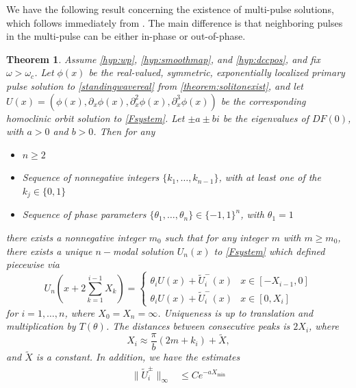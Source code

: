 \documentclass[12pt]{article}
\newtheorem{theorem}{Theorem}
\begin{document}
We have the following result concerning the existence of multi-pulse solutions, which follows immediately from \cite[Theorem~3.6]{SandstedeStrut}. The main difference is that neighboring pulses in the multi-pulse can be either in-phase or out-of-phase. 

\begin{theorem}\label{theorem:multiexist}
Assume \cref{hyp:wp}, \cref{hyp:smoothmap}, and \cref{hyp:dccpos}, and fix $\omega > \omega_c$. Let $\phi(x)$ be the real-valued, symmetric, exponentially localized primary pulse solution to \cref{standingwavereal} from \cref{theorem:solitonexist}, and let $U(x) = (\phi(x), \partial_x \phi(x), \partial_x^2 \phi(x), \partial_x^3 \phi(x))$ be the corresponding homoclinic orbit solution to \cref{Fsystem}. Let $\pm a \pm bi$ be the eigenvalues of $DF(0)$, with $a > 0$ and $b > 0$. Then for any 
\begin{itemize}
\item $n \geq 2$
\item Sequence of nonnegative integers $\{ k_1, \dots, k_{n-1} \}$, with at least one of the $k_j \in \{0, 1 \}$
\item Sequence of phase parameters $\{ \theta_1, \dots, \theta_n \} \in \{-1, 1 \}^n$, with $\theta_1 = 1$
\end{itemize}
there exists a nonnegative integer $m_0$ such that for any integer $m$ with $m \geq m_0$, there exists a unique $n-$modal solution $U_n(x)$ to \cref{Fsystem} which defined piecewise via
\begin{equation}\label{Unpiecewise}
U_n\left( x + 2 \sum_{k=1}^{i-1} X_k \right) = \begin{cases} 
\theta_i U(x) + \tilde{U}_i^-(x) & x \in [-X_{i-1}, 0] \\
\theta_i U(x) + \tilde{U}_i^-(x) & x \in [0, X_i]
\end{cases}
\end{equation}
for $i = 1, \dots, n$, where $X_0 = X_n = \infty$. Uniqueness is up to translation and multiplication by $T(\theta)$. The distances between consecutive peaks is $2 X_i$, where
\begin{equation}\label{pulsedistances}
X_i \approx \frac{\pi}{b}(2 m + k_i) + \tilde{X},
\end{equation}
and $\tilde{X}$ is a constant. In addition, we have the estimates
\begin{equation}\label{Unestimates}
\begin{aligned}
\|\tilde{U}_i^\pm\|_\infty &\leq C e^{-a X_{\mathrm{min}}} \\

\end{aligned}
\end{equation}
\end{theorem}
\end{document}
